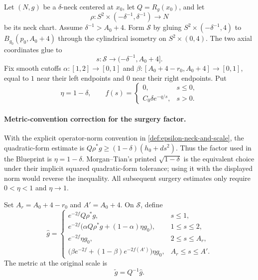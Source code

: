 \begin{definition}
\label{def:local-neck-surgery-data}
\notready
Let $(N,g)$ be a $\delta$-neck centered at $x_0$, let
$Q=R_g(x_0)$, and let
\[
 \rho\colon S^2\times(-\delta^{-1},\delta^{-1})\longrightarrow N
\]
be its neck chart.  Assume $\delta^{-1}>A_0+4$.  Form $\mathcal S$ by
gluing $S^2\times(-\delta^{-1},4)$ to
$B_{g_0}(p_0,A_0+4)$ through the cylindrical isometry on
$S^2\times(0,4)$.  The two axial coordinates glue to
\[
 s\colon\mathcal S\longrightarrow(-\delta^{-1},A_0+4].
\]
Fix smooth cutoffs $\alpha\colon[1,2]\to[0,1]$ and
$\beta\colon[A_0+4-r_0,A_0+4]\to[0,1]$, equal to $1$ near their left
endpoints and $0$ near their right endpoints.  Put
\[
 \eta=1-\delta,
 \qquad
 f(s)=\begin{cases}
 0,&s\le0,\\
 C_0\delta e^{-q/s},&s>0.
 \end{cases}
\]
\end{definition}

\paragraph{Metric-convention correction for the surgery factor.}
With the explicit operator-norm convention in
\ref{def:epsilon-neck-and-scale}, the quadratic-form estimate is
$Q\rho^*g\ge(1-\delta)(h_0+ds^2)$.  Thus the factor used in the
Blueprint is $\eta=1-\delta$.  Morgan--Tian's printed
$\sqrt{1-\delta}$ is the equivalent choice under their implicit squared
quadratic-form tolerance; using it with the displayed norm would reverse
the inequality.  All subsequent surgery estimates only require
$0<\eta<1$ and $\eta\to1$.

\begin{definition}
\label{def:interpolating-surgery-metric}
\notready
Set $A_r=A_0+4-r_0$ and $A'=A_0+4$.  On $\mathcal S$, define
\[
\widehat g=
\begin{cases}
 e^{-2f}Q\rho^*g,&s\le1,\\
 e^{-2f}\bigl(\alpha Q\rho^*g+(1-\alpha)\eta g_0\bigr),
     &1\le s\le2,\\
 e^{-2f}\eta g_0,&2\le s\le A_r,\\
 \bigl(\beta e^{-2f}+(1-\beta)e^{-2f(A')}\bigr)\eta g_0,
     &A_r\le s\le A'.
\end{cases}
\]
The metric at the original scale is
\[
 \widetilde g=Q^{-1}\widehat g.
\]
\end{definition}

